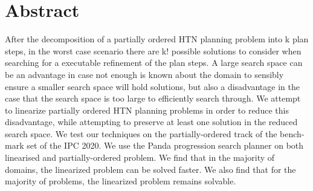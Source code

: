 \chapter*{Abstract}


After the decomposition of a partially ordered HTN planning problem into k plan steps, in the worst case scenario there are k! possible solutions to consider when searching for a executable refinement of the plan steps.
A large search space can be an advantage in case not enough is known about the domain to sensibly ensure a smaller search space will hold solutions,
but also a disadvantage in the case that the search space is too large to efficiently search through. We attempt to linearize partially ordered HTN planning problems in 
order to reduce this disadvantage, while attempting to preserve at least one solution in the reduced search space.
We test our techniques on the partially-ordered track of the bench-mark set of the IPC 2020. We use the Panda progression search planner on both linearised and partially-ordered problem. 
We find that in the majority of domains, the linearized problem can be solved faster. We also find that for the majority of problems, the linearized problem remains solvable.